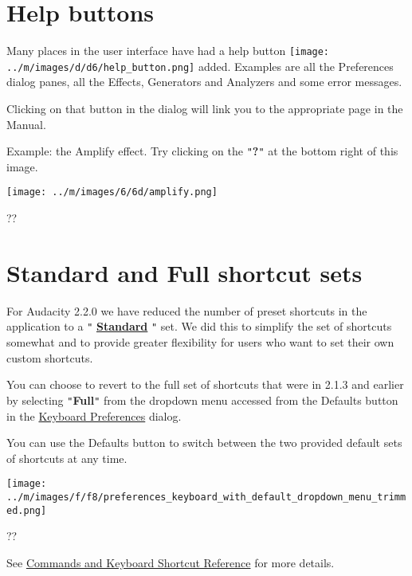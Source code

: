 \documentclass[]{book}
\begin{document}
\begin{multicols}{2}

\section{Help buttons}


Many places in the user interface have had a help button \texttt{[image: ../m/images/d/d6/help\_button.png]} added. Examples are all the Preferences dialog panes, all the Effects, Generators and Analyzers and some error messages.

Clicking on that button in the dialog will link you to the appropriate page in the Manual.

Example: the Amplify effect.  Try clicking on the \texttt{{}"{}}\textbf{?}\texttt{{}"{}} at the bottom right of this image.\par\texttt{[image: ../m/images/6/6d/amplify.png]}\par??



\section{Standard and Full shortcut sets}


For Audacity 2.2.0 we have reduced the number of preset shortcuts in the application to a \texttt{{}"{}}\textbf{
\hyperref[keyboard_shortcut_reference_]{Standard}
}\texttt{{}"{}} set.  We did this to simplify the set of shortcuts somewhat and to provide greater flexibility for users who want to set their own custom shortcuts.

You can choose to revert to the full set of shortcuts that were in 2.1.3 and earlier by selecting \texttt{{}"{}}\textbf{Full}\texttt{{}"{}} from the dropdown menu accessed from the Defaults button in the 
\hyperref[keyboard_preferences_]{Keyboard Preferences}
 dialog.

You can use the Defaults button to switch between the two provided default sets of shortcuts at any time.\par\texttt{[image: ../m/images/f/f8/preferences\_keyboard\_with\_default\_dropdown\_menu\_trimmed.png]}\par??

See 
\hyperref[keyboard_shortcut_reference_]{Commands and Keyboard Shortcut Reference}
 for more details.




\end{multicols}
\end{document}
